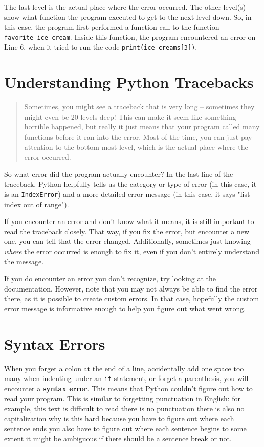 \documentclass{article}
\begin{document}
	The last level is the actual place where the error occurred. The other level(s) show what function the program executed to get to the next level down. So, in this case, the program first performed a function call to the function \texttt{favorite\_ice\_cream}. Inside this function, the program encountered an error on Line 6, when it tried to run the code \texttt{print(ice\_creams[3])}.
	
	\section{Understanding Python Tracebacks}
	
	\begin{quote}
		Sometimes, you might see a traceback that is very long -- sometimes they might even be 20 levels deep! This can make it seem like something horrible happened, but really it just means that your program called many functions before it ran into the error. Most of the time, you can just pay attention to the bottom-most level, which is the actual place where the error occurred.
	\end{quote}
	
	So what error did the program actually encounter? In the last line of the traceback, Python helpfully tells us the category or type of error (in this case, it is an \texttt{IndexError}) and a more detailed error message (in this case, it says "list index out of range").
	
	If you encounter an error and don't know what it means, it is still important to read the traceback closely. That way, if you fix the error, but encounter a new one, you can tell that the error changed. Additionally, sometimes just knowing \textit{where} the error occurred is enough to fix it, even if you don't entirely understand the message.
	
	If you do encounter an error you don't recognize, try looking at the documentation. However, note that you may not always be able to find the error there, as it is possible to create custom errors. In that case, hopefully the custom error message is informative enough to help you figure out what went wrong.
	
	\section{Syntax Errors}
	
	When you forget a colon at the end of a line, accidentally add one space too many when indenting under an \texttt{if} statement, or forget a parenthesis, you will encounter a \textbf{syntax error}. This means that Python couldn't figure out how to read your program. This is similar to forgetting punctuation in English: for example, this text is difficult to read there is no punctuation there is also no capitalization why is this hard because you have to figure out where each sentence ends you also have to figure out where each sentence begins to some extent it might be ambiguous if there should be a sentence break or not.
	
\end{document}
